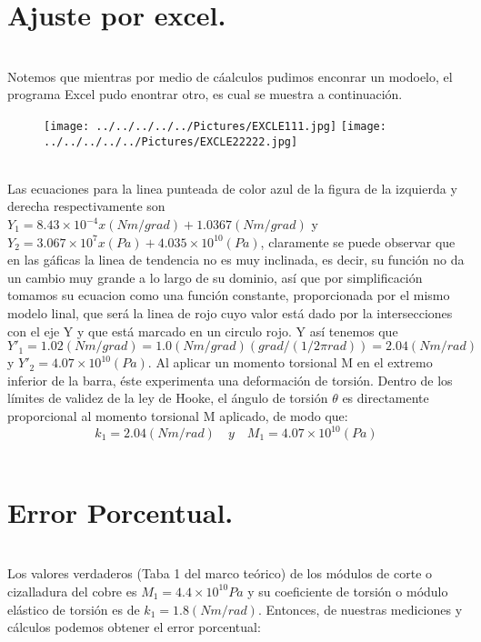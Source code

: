 \documentclass[10pt,a4paper]{article}
\begin{document}
\section*{Ajuste por excel.}\\
Notemos que mientras por medio de c\'{a}alculos pudimos enconrar un modoelo, el programa Excel pudo enontrar otro, es cual se muestra a continuaci\'{o}n.
\\
\begin{figure}[hbtp]
 \centering
\texttt{[image: ../../../../../Pictures/EXCLE111.jpg]}
\texttt{[image: ../../../../../Pictures/EXCLE22222.jpg]}  
\end{figure}
\\
Las ecuaciones para la linea punteada de color azul de la figura de la izquierda y derecha respectivamente son ${ Y }_{ 1 }= { 8.43\times 10 }^{ -4 }x(Nm/grad)+ 1.0367 (Nm/grad)$ y ${ Y }_{ 2 }= { 3.067\times 10 }^{ 7 }x(Pa)+ { 4.035\times  10 }^{ 10 } (Pa)$, claramente se puede observar que en las g\'{a}ficas la linea de tendencia no es muy inclinada, es decir, su funci\'{o}n no da un cambio muy grande a lo largo de su dominio, as\'{i} que por simplificaci\'{o}n tomamos su ecuacion como una funci\'{o}n constante, proporcionada por el mismo modelo linal, que ser\'{a} la linea de rojo cuyo valor est\'{a} dado por la intersecciones con el eje Y y que est\'{a} marcado en un circulo rojo. Y as\'{i} tenemos que ${ Y }'_{ 1 }= 1.02(Nm/grad)=1.0(Nm/grad)\left( { grad }/{ \left( { 1 }/{ 2\pi rad } \right)  } \right) =2.04(Nm/rad)$ y ${ Y }'_{ 2 }=4.07\times { 10 }^{ 10 }(Pa)$. Al aplicar un momento torsional M en el extremo inferior de la barra, \'{e}ste experimenta una deformaci\'{o}n de torsi\'{o}n. Dentro de los l\'{i}mites de validez de la ley de Hooke, el \'{a}ngulo de torsi\'{o}n $\theta$ es directamente proporcional al momento torsional M aplicado, de modo que:
\[{ k }_{ 1 }= 2.04(Nm/rad)\quad y \quad { M }_{ 1 }=4.07\times { 10 }^{ 10 }(Pa)\]
\\
\section*{Error Porcentual.}\\
Los valores verdaderos (Taba 1 del marco te\'{o}rico) de los m\'{o}dulos de corte o cizalladura del cobre es ${ M }_{ 1 }=4.4\times { 10 }^{ 10 }Pa$ y su  coeficiente de torsi\'{o}n o m\'{o}dulo el\'{a}stico de torsi\'{o}n es de ${ k }_{ 1 }=1.8(Nm/rad)$. Entonces, de nuestras mediciones y c\'{a}lculos podemos obtener el error porcentual:
\end{document}
